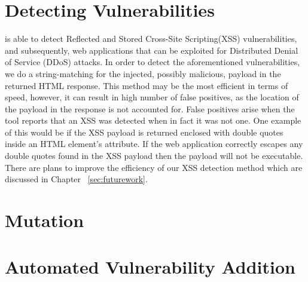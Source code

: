 \section{Detecting Vulnerabilities}
\pname{} is able to detect Reflected and Stored Cross-Site Scripting(XSS) vulnerabilities, and subsequently, web applications that can be exploited for Distributed Denial of Service (DDoS) attacks. In order to detect the aforementioned vulnerabilities, we do a string-matching for the injected, possibly malicious, payload in the returned HTML response. This method may be the most efficient in terms of speed, however, it can result in high number of false positives, as the location of the payload in the response is not accounted for. False positives arise when the tool reports that an XSS was detected when in fact it was not one. One example of this would be if the XSS payload is returned enclosed with double quotes inside an HTML element's attribute. If the web application correctly escapes any double quotes found in the XSS payload then the payload will not be executable. There are plans to improve the efficiency of our XSS detection method which are discussed in Chapter ~\ref{sec:futurework}.

\section{Mutation}

\section{Automated Vulnerability Addition}
